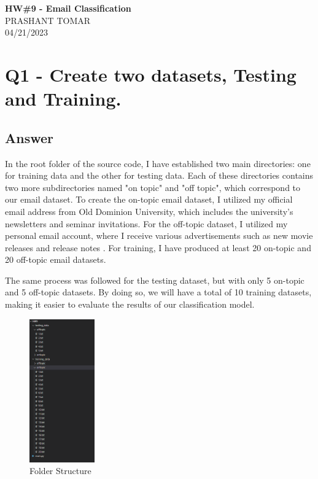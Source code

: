 \documentclass[12pt]{article}
\begin{document}
\begin{centering}
{\large\textbf{HW\#9 - Email Classification }}\\ %
PRASHANT TOMAR\\                     %
04/21/2023\\                      %
\end{centering}


\section*{Q1 - Create two datasets, Testing and Training.}

\subsection*{Answer}
In the root folder of the source code, I have established two main directories: one for training data and the other for testing data. Each of these directories contains two more subdirectories named "on topic" and "off topic", which correspond to our email dataset. To create the on-topic email dataset, I utilized my official email address from Old Dominion University, which includes the university's newsletters and seminar invitations. For the off-topic dataset, I utilized my personal email account, where I receive various advertisements such as new movie releases and release notes . For training, I have produced at least 20 on-topic and 20 off-topic email datasets.

The same process was followed for the testing dataset, but with only 5 on-topic and 5 off-topic datasets. By doing so, we will have a total of 10 training datasets, making it easier to evaluate the results of our classification model.
\\


\begin{figure}[h]
\caption{Folder Structure}
\centering
\includegraphics[width=0.25\textwidth]{pic1.png}
\end{figure}
\clearpage
\end{document}

